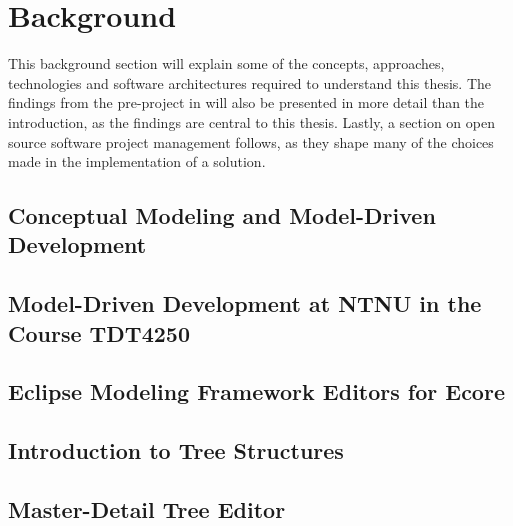 \chapter{Background}\label{chap:background}

This background section will explain some of the concepts, approaches, technologies and software architectures required to understand this thesis.
The findings from the pre-project in \cite{rekstadModelingEnvironmentCloud2020} will also be presented in more detail than the introduction, as the findings are central to this thesis.
Lastly, a section on open source software project management follows, as they shape many of the choices made in the implementation of a solution.

\section{Conceptual Modeling and Model-Driven Development}\label{sec:conceptual-modeling}




\section{Model-Driven Development at NTNU in the Course TDT4250}\label{sec:tdt4250}




\section{Eclipse Modeling Framework Editors for Ecore}\label{sec:emf-editors}




\section{Introduction to Tree Structures}\label{sec:tree-structures}




\section{Master-Detail Tree Editor}\label{sec:master-detail}




